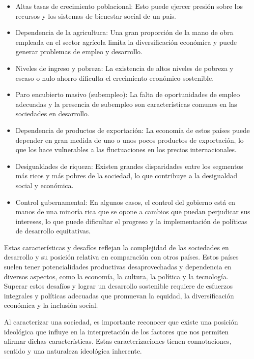 \documentclass[
  a4paper,
]{article}
\providecommand{\tightlist}{%
  \setlength{\itemsep}{0pt}\setlength{\parskip}{0pt}}\usepackage{longtable,booktabs,array}
\begin{document}
\begin{itemize}
\tightlist
\item
  Altas tasas de crecimiento poblacional: Esto puede ejercer presión
  sobre los recursos y los sistemas de bienestar social de un país.
\item
  Dependencia de la agricultura: Una gran proporción de la mano de obra
  empleada en el sector agrícola limita la diversificación económica y
  puede generar problemas de empleo y desarrollo.
\item
  Niveles de ingreso y pobreza: La existencia de altos niveles de
  pobreza y escaso o nulo ahorro dificulta el crecimiento económico
  sostenible.
\item
  Paro encubierto masivo (subempleo): La falta de oportunidades de
  empleo adecuadas y la presencia de subempleo son características
  comunes en las sociedades en desarrollo.
\item
  Dependencia de productos de exportación: La economía de estos países
  puede depender en gran medida de uno o unos pocos productos de
  exportación, lo que los hace vulnerables a las fluctuaciones en los
  precios internacionales.
\item
  Desigualdades de riqueza: Existen grandes disparidades entre los
  segmentos más ricos y más pobres de la sociedad, lo que contribuye a
  la desigualdad social y económica.
\item
  Control gubernamental: En algunos casos, el control del gobierno está
  en manos de una minoría rica que se opone a cambios que puedan
  perjudicar sus intereses, lo que puede dificultar el progreso y la
  implementación de políticas de desarrollo equitativas.
\end{itemize}

Estas características y desafíos reflejan la complejidad de las
sociedades en desarrollo y su posición relativa en comparación con otros
países. Estos países suelen tener potencialidades productivas
desaprovechadas y dependencia en diversos aspectos, como la economía, la
cultura, la política y la tecnología. Superar estos desafíos y lograr un
desarrollo sostenible requiere de esfuerzos integrales y políticas
adecuadas que promuevan la equidad, la diversificación económica y la
inclusión social.

Al caracterizar una sociedad, es importante reconocer que existe una
posición ideológica que influye en la interpretación de los factores que
nos permiten afirmar dichas características. Estas caracterizaciones
tienen connotaciones, sentido y una naturaleza ideológica inherente.
\end{document}

